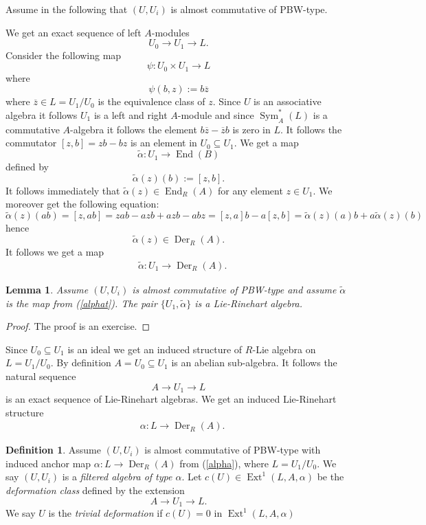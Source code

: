 \documentclass{amsart}
\theoremstyle{plain}
\newtheorem{lemma}[theorem]{Lemma}
\theoremstyle{definition}
\newtheorem{definition}[theorem]{Definition}
\theoremstyle{remark}
\numberwithin{equation}{theorem}
\begin{document}
Assume in the following that $(U,U_i)$ is almost commutative of PBW-type.

We get an exact sequence of left ${A}$-modules
\[  U_0 \rightarrow U_1 \rightarrow L  .\]
Consider the following map
\[\psi: U_0\times U_1 \rightarrow L\]
where
\[ \psi(b,z):=b\overline{z}\]
where $\overline{z}\in L=U_1/U_0$ is the equivalence class of $z$. Since $U$ is an associative algebra
it follows $U_1$ is a left and right ${A}$-module and since ${\operatorname{Sym} }_{A}^*(L)$ is a commutative ${A}$-algebra it follows
the element $b\overline{z}-\overline{z}b$ is zero in $L$. It follows the commutator $[z,b]=zb-bz$ is an element in
$U_0\subseteq U_1$.
We get a map
\[ \tilde{\alpha}:U_1\rightarrow {\operatorname{End} }(B) \]
defined by
\[ \tilde{\alpha}(z)(b):=[z,b].\]
It follows immediately that $\tilde{\alpha}(z)\in {\operatorname{End} }_{R}({A})$
for any element $z\in U_1$. We moreover get the following equation:
\[ \tilde{\alpha}(z)(ab)=[z,ab]=zab-azb+azb-abz=[z,a]b-a[z,b]=\tilde{\alpha}(z)(a)b+a\tilde{\alpha}(z)(b)\]
hence
\[\tilde{\alpha}(z)\in {\operatorname{Der} }_{R}({A}).\]
It follows we get a map
\begin{align}
&\label{alphat} \tilde{\alpha}:U_1\rightarrow {\operatorname{Der} }_{R}({A}).
\end{align}
\begin{lemma} Assume $(U,U_i)$ is almost commutative of PBW-type and assume $\tilde{\alpha}$ is the 
map from (\ref{alphat}). The pair $\{U_1,\tilde{\alpha}\}$ is a Lie-Rinehart algebra.
\end{lemma}
\begin{proof} The proof is an exercise.
\end{proof}

Since $U_0\subseteq U_1$ is an ideal we get an induced structure of ${R}$-Lie algebra on $L=U_1/U_0$.
By definition ${A}=U_0\subseteq U_1$ is an abelian sub-algebra. It follows the natural sequence
\[ {A} \rightarrow U_1 \rightarrow L \]
is an exact sequence of Lie-Rinehart algebras. We get an induced Lie-Rinehart structure
\begin{align}
&\label{alpha}  \alpha:L\rightarrow {\operatorname{Der} }_{R}({A}) .
\end{align}
\begin{definition} \label{filteredalgebra} Assume $(U,U_i)$ is almost commutative of PBW-type
with induced anchor map $\alpha:L\rightarrow {\operatorname{Der} }_{R}({A})$ from (\ref{alpha}), where $L=U_1/U_0$.
We say $(U,U_i)$ is a \emph{filtered algebra of type $\alpha$}.
Let $c(U)\in {\operatorname{Ext} }^1(L,{A},\alpha)$ be the \emph{ deformation class} defined by the extension
\[  {A}\rightarrow U_1 \rightarrow L  .\]
We say $U$ is the \emph{trivial deformation} if $c(U)=0$ in ${\operatorname{Ext} }^1(L,{A},\alpha)$
\end{definition}
\end{document}
